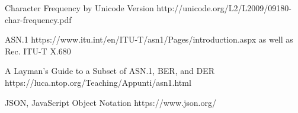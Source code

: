 \begin{thebibliography}{12}

  Character Frequency by Unicode Version
  http://unicode.org/L2/L2009/09180-char-frequency.pdf

  ASN.1
  https://www.itu.int/en/ITU-T/asn1/Pages/introduction.aspx
  as well as Rec. ITU-T X.680

  A Layman's Guide to a Subset of ASN.1, BER, and DER
  https://luca.ntop.org/Teaching/Appunti/asn1.html

  JSON, JavaScript Object Notation
  https://www.json.org/

\end{thebibliography}
